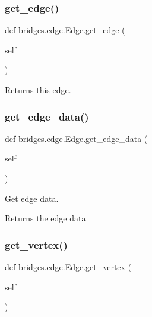 \subsubsection{\texorpdfstring{get\+\_\+edge()}{get\_edge()}}
{\footnotesize\ttfamily def bridges.\+edge.\+Edge.\+get\+\_\+edge (\begin{DoxyParamCaption}\item[{}]{self }\end{DoxyParamCaption})}



Returns this edge. 

\mbox{\label{classbridges_1_1edge_1_1_edge_ae26e8172b91667d829b86145ce88208e}} 
\subsubsection{\texorpdfstring{get\+\_\+edge\+\_\+data()}{get\_edge\_data()}}
{\footnotesize\ttfamily def bridges.\+edge.\+Edge.\+get\+\_\+edge\+\_\+data (\begin{DoxyParamCaption}\item[{}]{self }\end{DoxyParamCaption})}



Get edge data. 

\begin{DoxyReturn}{Returns}
the edge data 
\end{DoxyReturn}
\mbox{\label{classbridges_1_1edge_1_1_edge_a1c1978781d77f24f76dbdd7dc95e8e9f}} 
\subsubsection{\texorpdfstring{get\+\_\+vertex()}{get\_vertex()}}
{\footnotesize\ttfamily def bridges.\+edge.\+Edge.\+get\+\_\+vertex (\begin{DoxyParamCaption}\item[{}]{self }\end{DoxyParamCaption})}



